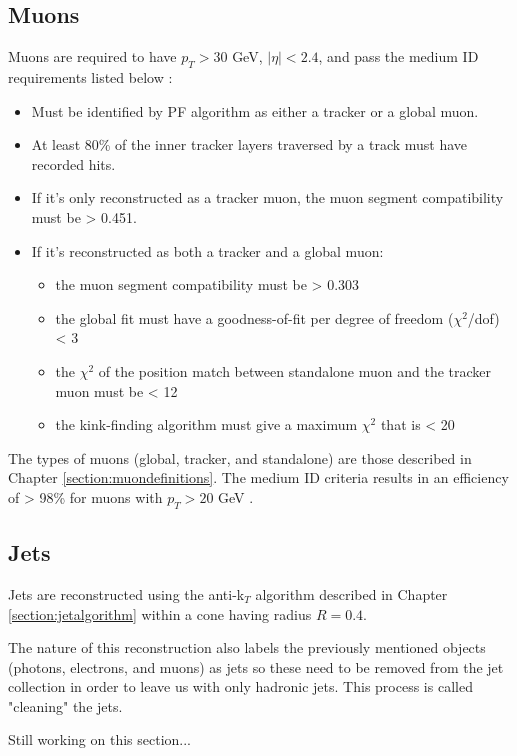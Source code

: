 \subsection{Muons}
Muons are required to have $p_T > 30$ GeV, $|\eta|<2.4$, and pass the medium ID requirements listed below \cite{Sirunyan_2018}:
\begin{itemize}
	\item Must be identified by PF algorithm as either a tracker or a global muon.
	\item At least 80\% of the inner tracker layers traversed by a track must have recorded hits.
	\item If it's only reconstructed as a tracker muon, the muon segment compatibility must be > 0.451.
	\item If it's reconstructed as both a tracker and a global muon:
	\begin{itemize}
		\item the muon segment compatibility must be > 0.303
		\item the global fit must have a goodness-of-fit per degree of freedom  ($\chi^2$/dof) < 3
		\item the $\chi^2$ of the position match between standalone muon and the tracker muon must be < 12
		\item the kink-finding algorithm must give a maximum $\chi^2$ that is < 20
	\end{itemize}
\end{itemize}		
The types of muons (global, tracker, and standalone) are those described in Chapter \ref{section:muondefinitions}.  The medium ID criteria results in an efficiency of > 98\% for muons with $p_T > 20$ GeV \cite{MuonIDPerf}.

\subsection{Jets}
Jets are reconstructed using the anti-k$_T$ algorithm described in Chapter \ref{section:jetalgorithm} within a cone having radius $R = 0.4$.  

The nature of this reconstruction also labels the previously mentioned objects (photons, electrons, and muons) as jets so these need to be removed from the jet collection in order to leave us with only hadronic jets.  This process is called "cleaning" the jets. 

Still working on this section...

\label{section:jetdefinition}

